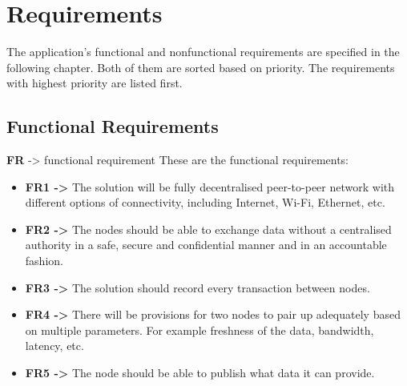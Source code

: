 \chapter{Requirements\label{chap:requirements}}
\quad The application's functional and nonfunctional requirements are specified in the following chapter. Both of them are sorted based on priority. The requirements with highest priority are listed first.

\section{Functional Requirements}
\textbf{FR} -> functional requirement  \newline
These are the functional requirements:

\begin{itemize}
\item \textbf{FR1 ->} The solution will be fully decentralised peer-to-peer network with different options of connectivity, including Internet, Wi-Fi, Ethernet, etc.
\item \textbf{FR2 ->} The nodes should be able to exchange data without a centralised authority in a safe, secure and confidential manner and in an accountable fashion.
\item \textbf{FR3 ->} The solution should record every transaction between nodes.
\item \textbf{FR4 ->} There will be provisions for two nodes to pair up adequately based on multiple parameters. For example freshness of the data, bandwidth, latency, etc.
\item \textbf{FR5 ->} The node should be able to publish what data it can provide.
\end{itemize}
\vspace{\baselineskip}

